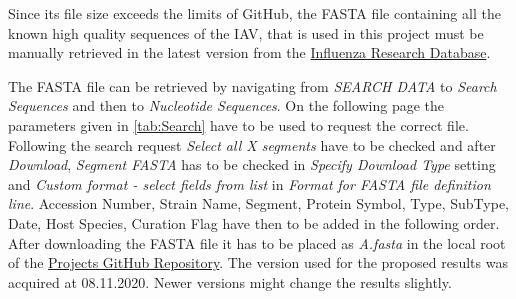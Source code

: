 Since its file size exceeds the limits of GitHub, the FASTA file containing all the known high quality sequences of the \gls{IAV}, that is used in this project must be manually retrieved in the latest version from the \href{https://www.fludb.org/brc/home.spg?decorator=influenza}{Influenza Research Database}.

\begin{table}[!hbt]
    \centering
    \caption[Search Parameter for FASTA file]{\textbf{Search Parameter for FASTA file.}.}
    \label{tab:Search}
\end{table}

The FASTA file can be retrieved by navigating from \textit{SEARCH DATA} to \textit{Search Sequences} and then to \textit{Nucleotide Sequences}. On the following page the parameters given in \autoref{tab:Search} have to be used to request the correct file. Following the search request \textit{Select all X segments} have to be checked and after \textit{Download}, \textit{Segment FASTA} has to be checked in \textit{Specify Download Type} setting and \textit{Custom format - select fields from list} in \textit{Format for FASTA file definition line}. Accession Number, Strain Name, Segment, Protein Symbol, Type, SubType, Date, Host Species, Curation Flag have then to be added in the following order. After downloading the FASTA file it has to be placed as \textit{A.fasta} in the local root of the \href{https://github.com/ahenoch/Masterthesis.git}{Projects GitHub Repository}. The version used for the proposed results was acquired at 08.11.2020. Newer versions might change the results slightly.

